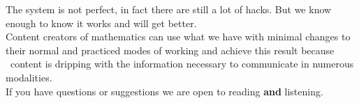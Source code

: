 \documentclass[presentation,aspectratio=169]{beamer}
\begin{document}
\begin{frame}
    The system is not perfect, in fact there are still a lot of hacks.
    But we know enough to know it works and will get better.\\[20pt]

    Content creators of mathematics 
    can use what we have with minimal changes to their normal and 
    practiced modes of working and achieve this result because 
    \LaTeXe ~content is dripping with the information necessary 
    to communicate in numerous modalities. \\[20pt]

    If you have questions or suggestions 
    we are open to reading \textbf{and} listening.
\end{frame}
\end{document}
